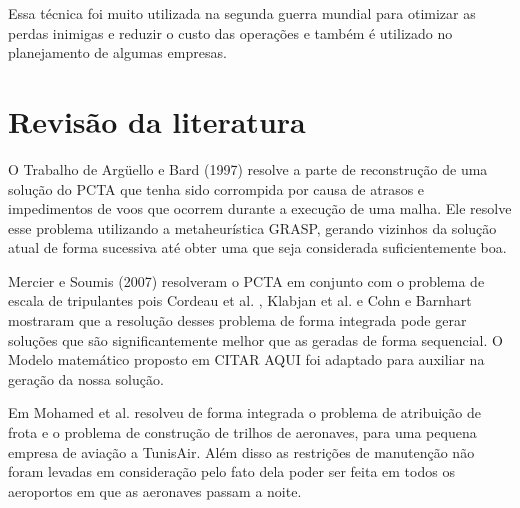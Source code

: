  	Essa técnica foi muito utilizada na segunda guerra mundial para otimizar as perdas inimigas e reduzir o custo das operações e também é utilizado no planejamento de algumas empresas.

\section{Revisão da literatura}
	
		O Trabalho de Argüello e Bard \citep{arguelo1007} (1997) resolve a parte de reconstrução de uma solução do PCTA que tenha sido corrompida por causa de atrasos e impedimentos de voos que ocorrem durante a execução de uma malha. Ele resolve esse problema utilizando a metaheurística GRASP, gerando vizinhos da solução atual de forma sucessiva até obter uma que seja considerada suficientemente boa.
		
		Mercier e Soumis \cite{mercier2007} (2007) resolveram o PCTA em conjunto com o problema de escala de tripulantes pois Cordeau et al. \cite{cordeau2001}, Klabjan et al. \cite{klabjan2002} e Cohn e Barnhart \cite{mainville2003} mostraram que a resolução desses problema de forma integrada pode gerar soluções que são significantemente melhor que as geradas de forma sequencial. O Modelo matemático proposto em CITAR AQUI foi adaptado para auxiliar na geração da nossa solução. 
		
		Em \cite{mohamed2011} Mohamed et al. resolveu de forma integrada o problema de atribuição de frota e o problema de construção de trilhos de aeronaves, para uma pequena empresa de aviação a TunisAir. Além disso as restrições de manutenção não foram levadas em consideração pelo fato dela poder ser feita em todos os aeroportos em que as aeronaves passam a noite.
		
